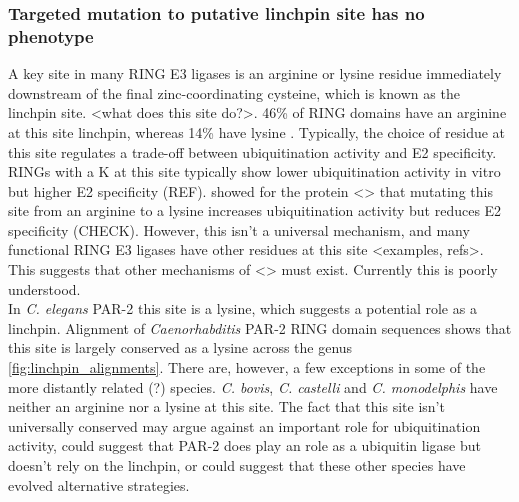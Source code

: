 \documentclass[12pt]{"article"}
\begin{document}
\subsubsection{Targeted mutation to putative linchpin site has no phenotype}

A key site in many RING E3 ligases is an arginine or lysine residue immediately downstream of the final zinc-coordinating cysteine, which is known as the linchpin site. <what does this site do?>. 46\% of RING domains have an arginine at this site linchpin, whereas 14\% have lysine \citep{Stewart2017}. Typically, the choice of residue at this site regulates a trade-off between ubiquitination activity and E2 specificity. RINGs with a K at this site typically show lower ubiquitination activity in vitro but higher E2 specificity (REF). \textcite{Stewart2017} showed for the protein <> that mutating this site from an arginine to a lysine increases ubiquitination activity but reduces E2 specificity (CHECK). However, this isn't a universal mechanism, and many functional RING E3 ligases have other residues at this site <examples, refs>. This suggests that other mechanisms of <> must exist. Currently this is poorly understood.\\

In \textit{C. elegans} PAR-2 this site is a lysine, which suggests a potential role as a linchpin. Alignment of \textit{Caenorhabditis} PAR-2 RING domain sequences shows that this site is largely conserved as a lysine across the genus \cref{fig:linchpin_alignments}. There are, however, a few exceptions in some of the more distantly related (?) species. \textit{C. bovis}, \textit{C. castelli} and \textit{C. monodelphis} have neither an arginine nor a lysine at this site. The fact that this site isn't universally conserved may argue against an important role for ubiquitination activity, could suggest that PAR-2 does play an role as a ubiquitin ligase but doesn't rely on the linchpin, or could suggest that these other species have evolved alternative strategies.\\ 
\end{document}
